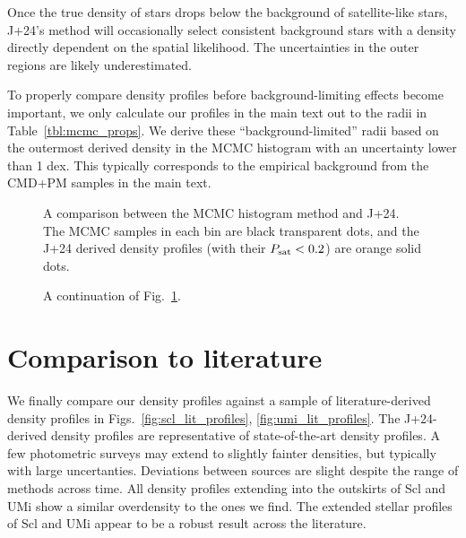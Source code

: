 Once the true density of stars drops below the background of
satellite-like stars, J+24's method will occasionally select consistent
background stars with a density directly dependent on the spatial
likelihood. The uncertainties in the outer regions are likely
underestimated.

To properly compare density profiles before background-limiting effects
become important, we only calculate our profiles in the main text out to
the radii in Table~\ref{tbl:mcmc_props}. We derive these
``background-limited'' radii based on the outermost derived density in
the MCMC histogram with an uncertainty lower than 1 dex. This typically
corresponds to the empirical background from the CMD+PM samples in the
main text.

\begin{figure}
\centering
{}
\caption[Probabilistic density profiles]{A comparison between the MCMC
histogram method and J+24. The MCMC samples in each bin are black
transparent dots, and the J+24 derived density profiles (with their
\(P_{\rm sat} < 0.2\)) are orange solid dots.}\label{fig:mcmc_hists}
\end{figure}

\begin{figure}
\centering
{}
\caption[Probabilistic density profiles continued]{A continuation of
Fig.~\ref{fig:mcmc_hists}.}\label{fig:mcmc_hists2}
\end{figure}

\section{Comparison to literature}\label{comparison-to-literature}

We finally compare our density profiles against a sample of
literature-derived density profiles in
Figs.~\ref{fig:scl_lit_profiles}, \ref{fig:umi_lit_profiles}. The
J+24-derived density profiles are representative of state-of-the-art
density profiles. A few photometric surveys may extend to slightly
fainter densities, but typically with large uncertanties. Deviations
between sources are slight despite the range of methods across time. All
density profiles extending into the outskirts of Scl and UMi show a
similar overdensity to the ones we find. The extended stellar profiles
of Scl and UMi appear to be a robust result across the literature.

